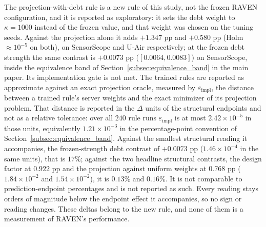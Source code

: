\documentclass[letterpaper,journal]{IEEEtran}
\begin{document}
The projection-with-debt rule is a new rule of this study, not the frozen RAVEN
configuration, and it is reported as exploratory: it sets the debt weight to
$\kappa=1000$ instead of the frozen value, and that weight was chosen on the
tuning seeds.  Against the projection alone it adds $+1.347$ pp and $+0.580$ pp
(Holm $\approx10^{-5}$ on both), on SensorScope and U-Air respectively; at the
frozen debt strength the same contrast is $+0.0073$ pp ($[0.0064,0.0083]$) on
SensorScope, inside the equivalence band of
Section~\ref{subsec:equivalence_band} in the main paper.  Its implementation
gate is not met.  The trained rules are reported as approximate against an exact
projection oracle, measured by $\varepsilon_{\mathrm{impl}}$, the distance
between a trained rule's server weights and the exact minimizer of its
projection problem.  That distance is reported in the $\Delta$ units of
the structural endpoints and not as a relative tolerance: over all $240$ rule
runs $\varepsilon_{\mathrm{impl}}$ is at most $2.42\times10^{-5}$ in those units,
equivalently $1.21\times10^{-3}$ in the percentage-point convention of
Section~\ref{subsec:equivalence_band}.  Against the smallest structural reading
it accompanies, the frozen-strength debt contrast of $+0.0073$ pp
($1.46\times10^{-4}$ in the same units), that is $17\%$; against the two headline
structural contrasts, the design factor at $0.922$ pp and the projection against
uniform weights at $0.768$ pp ($1.84\times10^{-2}$ and $1.54\times10^{-2}$), it is
$0.13\%$ and $0.16\%$.  It is not comparable to
prediction-endpoint percentages and is not reported as such.  Every reading
stays orders of magnitude below the endpoint effect it accompanies, so no sign
or reading changes.  These deltas belong to the new rule, and none of them is a
measurement of RAVEN's performance.

\makeatletter\@fileswfalse\makeatother


\makeatletter\@fileswtrue\makeatother
\end{document}
